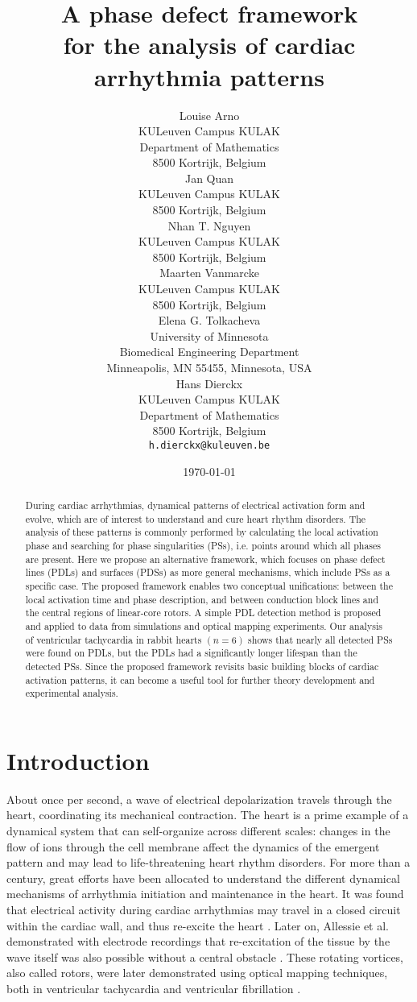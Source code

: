 \documentclass{article}
\title{A phase defect framework\\  for the analysis of cardiac arrhythmia patterns}
\author{Louise Arno \\
    KULeuven Campus KULAK \\ Department of Mathematics\\ 8500 Kortrijk, Belgium \\
    \And
	Jan Quan \\
	KULeuven Campus KULAK\\ 8500 Kortrijk, Belgium \\
	\AND
	Nhan T. Nguyen \\
	KULeuven Campus KULAK\\ 8500 Kortrijk, Belgium \\ 
	\And
	Maarten Vanmarcke \\
	KULeuven Campus KULAK\\ 8500 Kortrijk, Belgium \\ 
	\AND
	Elena G. Tolkacheva \\
     University of Minnesota\\ Biomedical Engineering Department\\ Minneapolis, MN 55455, Minnesota, USA \\
     \And
	Hans Dierckx \\
	KULeuven Campus KULAK\\ Department of Mathematics \\ 8500 Kortrijk, Belgium \\
	\texttt{h.dierckx@kuleuven.be} 
}
\date{\today}
\begin{document}
\maketitle

\begin{abstract}
During cardiac arrhythmias, dynamical patterns of electrical activation form and evolve, which are of interest to understand and cure heart rhythm disorders. The analysis of these patterns is commonly performed by calculating the local activation phase and searching for phase singularities (PSs), i.e. points around which all phases are present. 
Here we propose an alternative framework, which focuses on phase defect lines (PDLs) and surfaces (PDSs) as more general mechanisms, which include PSs as a specific case. The proposed framework enables two conceptual unifications: between the local activation time and phase description, and between conduction block lines and the central regions of linear-core rotors. A simple PDL detection method is proposed and applied to data from simulations and optical mapping experiments. Our analysis of ventricular tachycardia in rabbit hearts $(n=6)$ shows that nearly all detected PSs were found on PDLs, but the PDLs had a significantly longer lifespan than the detected PSs. Since the proposed framework revisits basic building blocks of cardiac activation patterns, it can become a useful tool for further theory development and experimental analysis.
\end{abstract}

\section{Introduction}\label{sec:intro}

About once per second, a wave of electrical depolarization travels through the heart, coordinating its mechanical contraction. The heart is a prime example of a dynamical system that can self-organize across different scales: changes in the flow of ions through the cell membrane affect the dynamics of the emergent pattern and may lead to life-threatening heart rhythm disorders. For more than a century, great efforts have been allocated to understand the different dynamical mechanisms of arrhythmia initiation and maintenance in the heart. It was found that electrical activity during cardiac arrhythmias may travel in a closed circuit within the cardiac wall, and thus re-excite the heart \citep{Mines:1913}. Later on, Allessie et al. demonstrated with electrode recordings that re-excitation of the tissue by the wave itself was also possible without a central obstacle \cite{Allessie:1973}. These rotating vortices, also called rotors, were later demonstrated using optical mapping techniques, both in ventricular tachycardia \cite{Gray:1995b} and ventricular fibrillation \cite{Gray:1998}. 
\end{document}
